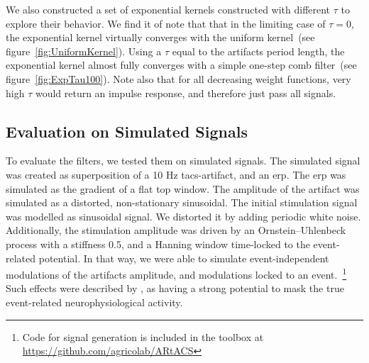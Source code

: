 \documentclass[a4paper]{article}
\newcommand{\figref}[1]{(see figure~\ref{#1})}
\begin{document}
We also constructed a set of exponential kernels constructed with different $\tau$ to explore their behavior.
We find it of note that that in the limiting case of $\tau = 0$, the exponential kernel virtually converges with the uniform kernel~\figref{fig:UniformKernel}. Using a $\tau$ equal to the artifacts period length, the exponential kernel almost fully converges with a simple one-step comb filter~\figref{fig:ExpTau100}.
Note also that for all decreasing weight functions, very high $\tau$ would return an impulse response, and therefore just pass all signals.

\subsection{Evaluation on Simulated Signals}\label{sec:EvaluationSimulated}

To evaluate the filters, we tested them on simulated signals. The simulated signal was created as superposition of a 10 Hz \gls{tacs}-artifact, and an \gls{erp}.
The \gls{erp} was simulated as the gradient of a flat top window. The amplitude of the artifact was simulated as a distorted, non-stationary sinusoidal.
The initial stimulation signal was modelled as sinusoidal signal. We distorted it by adding periodic white noise. Additionally, the stimulation amplitude was driven by an Ornstein–Uhlenbeck process with a stiffness 0.5, and a Hanning window time-locked to the event-related potential.
In that way, we were able to simulate event-independent modulations of the artifacts amplitude, and modulations locked to an event.~\footnote{Code for signal generation is included in the toolbox at \url{https://github.com/agricolab/ARtACS}}
Such effects were described by \citep{Noury_2016}, as having a strong potential to mask the true event-related neurophysiological activity.
\end{document}
